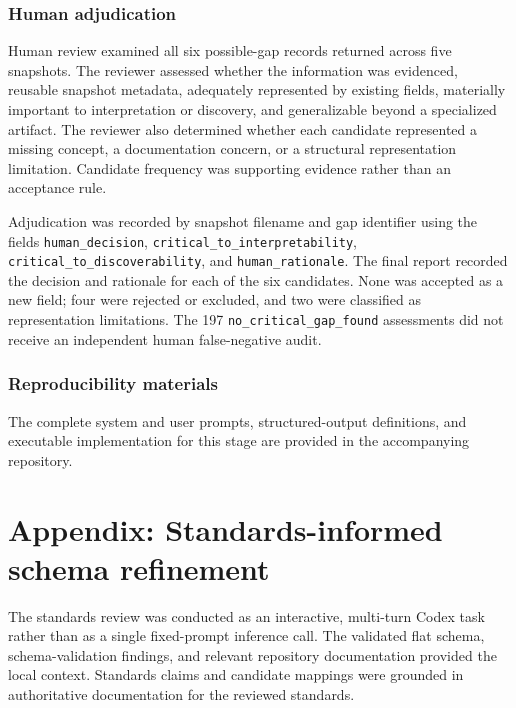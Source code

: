 \documentclass{article}
\begin{document}
\subsubsection{Human adjudication}

Human review examined all six possible-gap records returned across five snapshots. The reviewer assessed whether the information was evidenced, reusable snapshot metadata, adequately represented by existing fields, materially important to interpretation or discovery, and generalizable beyond a specialized artifact. The reviewer also determined whether each candidate represented a missing concept, a documentation concern, or a structural representation limitation. Candidate frequency was supporting evidence rather than an acceptance rule.

Adjudication was recorded by snapshot filename and gap identifier using the fields \texttt{human\_decision}, \texttt{critical\_to\_interpretability}, \texttt{critical\_to\_discoverability}, and \texttt{human\_rationale}. The final report recorded the decision and rationale for each of the six candidates. None was accepted as a new field; four were rejected or excluded, and two were classified as representation limitations. The 197 \texttt{no\_critical\_gap\_found} assessments did not receive an independent human false-negative audit.

\subsubsection{Reproducibility materials}

The complete system and user prompts, structured-output definitions, and executable implementation for this stage are provided in the accompanying repository.

\section{Appendix: Standards-informed schema refinement}
\label{appendix:standards_refinement}

The standards review was conducted as an interactive, multi-turn Codex task rather than as a single fixed-prompt inference call. The validated flat schema, schema-validation findings, and relevant repository documentation provided the local context. Standards claims and candidate mappings were grounded in authoritative documentation for the reviewed standards.
\end{document}
